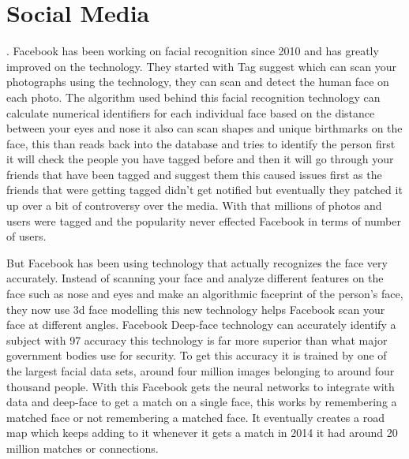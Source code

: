 \documentclass[report]{IEEEtran}
\begin{document}
\section{Social Media}.\newline
Facebook has been working on facial recognition since 2010 and has greatly improved on the technology. They started with Tag suggest which can scan your photographs using the technology,  they can scan and detect the human face on each photo. The algorithm used behind this facial recognition technology can calculate numerical identifiers for each individual face based on the distance between your eyes and nose it also can scan shapes and unique birthmarks on the face, this than reads back into the database and tries to identify the person first it will check the people you have tagged before and then it will go through your friends that have been tagged and suggest them this caused issues first as the friends that were getting tagged didn't get notified but eventually they patched it up over a bit of controversy over the media\cite{9503739920140321}. With that millions of photos and users were tagged and the popularity never effected Facebook in terms of number of users. 

But Facebook has been using  technology that actually recognizes the face very accurately. Instead of scanning your face and analyze different features on the face such as nose and eyes and make an algorithmic faceprint of the person's face, they now use 3d face modelling this new technology helps Facebook scan your face at different angles. Facebook Deep-face technology can accurately  identify a subject with 97 accuracy this technology is far more superior than what major government bodies use for security.  To get this accuracy it is trained by one of the largest facial data sets, around four million images belonging to around four thousand people. With this Facebook gets the neural networks to integrate with data and deep-face to get a match on a single face, this works by remembering a matched face or not remembering a matched face. It eventually creates a road map which keeps adding to it whenever it gets a match in 2014 it had around 20 million matches or connections\cite{DeepFace}.
\end{document}
